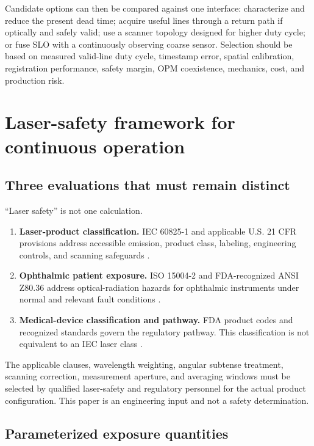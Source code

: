 \documentclass[11pt]{article}
\begin{document}
Candidate options can then be compared against one interface: characterize and reduce the present
dead time; acquire useful lines through a return path if optically and safely valid; use a scanner
topology designed for higher duty cycle; or fuse SLO with a continuously observing coarse sensor.
Selection should be based on measured valid-line duty cycle, timestamp error, spatial calibration,
registration performance, safety margin, OPM coexistence, mechanics, cost, and production risk.

\section{Laser-safety framework for continuous operation}

\subsection{Three evaluations that must remain distinct}

``Laser safety'' is not one calculation.

\begin{enumerate}
  \item \textbf{Laser-product classification.} IEC 60825-1 and applicable U.S. 21 CFR provisions
  address accessible emission, product class, labeling, engineering controls, and scanning
  safeguards \cite{IEC60825,FDA1040}.
  \item \textbf{Ophthalmic patient exposure.} ISO 15004-2 and FDA-recognized ANSI Z80.36 address
  optical-radiation hazards for ophthalmic instruments under normal and relevant fault
  conditions \cite{ISO15004,ANSI8036}.
  \item \textbf{Medical-device classification and pathway.} FDA product codes and recognized
  standards govern the regulatory pathway. This classification is not equivalent to an IEC laser
  class \cite{FDAMYC}.
\end{enumerate}

The applicable clauses, wavelength weighting, angular subtense treatment, scanning correction,
measurement aperture, and averaging windows must be selected by qualified laser-safety and
regulatory personnel for the actual product configuration. This paper is an engineering input and
not a safety determination.

\subsection{Parameterized exposure quantities}
\end{document}
